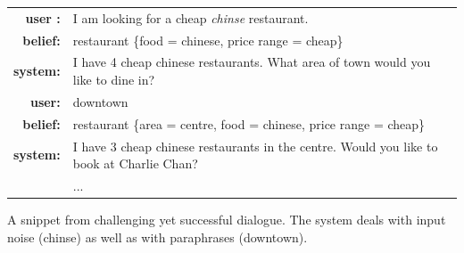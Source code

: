 \documentclass[11pt,a4paper]{article}
\begin{document}
\begin{example}[t]
\small
\setlength{\tabcolsep}{2pt}
\begin{mdframed}[style=ExampleFrame]
\begin{tabularx}{\textwidth}{rX}
\bf user : & I am looking for a cheap \textit{chinse} restaurant. \\
\bf belief: & restaurant \{food = chinese, price range = cheap\} \\
\bf system: & I have 4 cheap chinese restaurants. What area of town would you like to dine in?\\
\bf user: & downtown   \\ 
\bf belief: & restaurant \{area = centre, food = chinese, price range = cheap\} \\
\bf system: & I have 3 cheap chinese restaurants in the centre. Would you like to book at Charlie Chan?\\
 & ... \\

\end{tabularx}
\end{mdframed}
\caption{A snippet from challenging yet successful dialogue. The system deals with input noise (chinse) as well as with paraphrases (downtown). \label{ex:success}}
\end{example}
\end{document}
